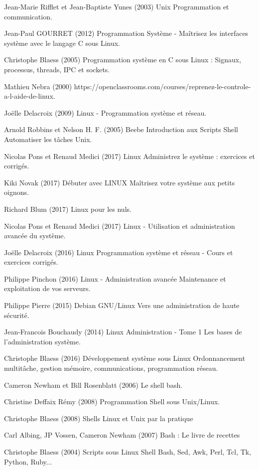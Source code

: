 \begin{thebibliography}{69}

 Jean-Marie Rifflet et Jean-Baptiste Yunes (2003) Unix Programmation et communication. 

 Jean-Paul GOURRET (2012) Programmation Système - Maîtrisez les interfaces système avec le langage C sous Linux.

 Christophe Blaess (2005) Programmation système en C sous Linux : Signaux, processus, threads, IPC et sockets.

 Mathieu Nebra (2000) https://openclassrooms.com/courses/reprenez-le-controle-a-l-aide-de-linux.

 Joëlle Delacroix (2009) Linux - Programmation système et réseau.

 Arnold Robbins et Nelson H. F. (2005) Beebe Introduction aux Scripts Shell Automatiser les tâches Unix.

 Nicolas Pons et Renaud Medici (2017) Linux Administrez le système : exercices et corrigés.

 Kiki Novak (2017) Débuter avec LINUX Maîtrisez votre système aux petits oignons.

 Richard Blum (2017) Linux pour les nuls.

 Nicolas Pons et Renaud Medici (2017) Linux - Utilisation et administration avancée du système.

 Joëlle Delacroix (2016) Linux Programmation système et réseau - Cours et exercices corrigés.

 Philippe Pinchon (2016) Linux - Administration avancée Maintenance et exploitation de vos serveurs.

 Philippe Pierre (2015) Debian GNU/Linux Vers une administration de haute sécurité.

 Jean-Francois Bouchaudy (2014) Linux Administration - Tome 1 Les bases de l'administration système.

 Christophe Blaess (2016) Développement système sous Linux Ordonnancement multitâche, gestion mémoire, communications, programmation réseau.

 Cameron Newham et Bill Rosenblatt (2006) Le shell bash.

 Christine Deffaix Rémy (2008) Programmation Shell sous Unix/Linux.

 Christophe Blaess (2008) Shells Linux et Unix par la pratique

 Carl Albing, JP Vossen, Cameron Newham (2007) Bash : Le livre de recettes

 Christophe Blaess (2004) Scripts sous Linux Shell Bash, Sed, Awk, Perl, Tcl, Tk, Python, Ruby...

\end{thebibliography}
